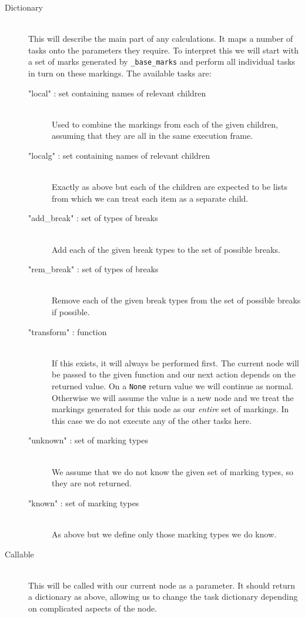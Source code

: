 \documentclass[twoside,a4paper]{report}
\begin{document}
\begin{description}
\item[Dictionary] \hfill \\
This will describe the main part of any calculations. It maps a number of tasks onto the parameters they require. To interpret this we will
start with a set of marks generated by \texttt{\_base\_marks} and perform all individual tasks in turn on these markings. The available tasks are:

\begin{description}
\item["local" : set containing names of relevant children] \hfill \\
Used to combine the markings from each of the given children, assuming that they are all in the same execution frame.
\item["localg" : set containing names of relevant children] \hfill \\
Exactly as above but each of the children are expected to be lists from which we can treat each item as a separate child.
\item["add\_break" : set of types of breaks] \hfill \\
Add each of the given break types to the set of possible breaks.
\item["rem\_break" : set of types of breaks] \hfill \\
Remove each of the given break types from the set of possible breaks if possible.
\item["transform" : function] \hfill \\
If this exists, it will always be performed first. The current node will be passed to the given function and our next action depends on the returned value. On a
\texttt{None} return value we will continue as normal. Otherwise we will assume the value is a new node and we treat the markings generated for this node as our
\textit{entire} set of markings. In this case we do not execute any of the other tasks here.
\item["unknown" : set of marking types] \hfill \\
We assume that we do not know the given set of marking types, so they are not returned.
\item["known" : set of marking types] \hfill \\
As above but we define only those marking types we do know.
\end{description}

\item[Callable] \hfill \\
This will be called with our current node as a parameter. It should return a dictionary as above, allowing us to change the task dictionary depending on
complicated aspects of the node.


\end{description}
\end{document}
